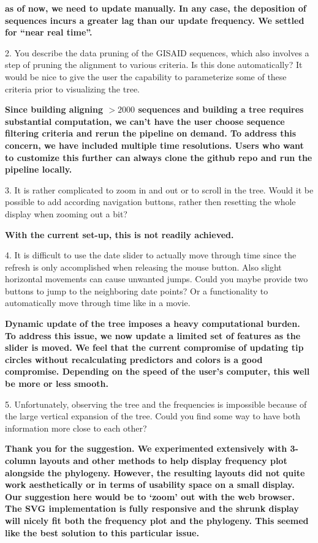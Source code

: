 \documentclass[11pt,oneside,letterpaper]{article}
\begin{document}
{\bf as of now, we need to update manually. In any case, the deposition of sequences incurs a greater lag than our update frequency. We settled for ``near real time''.}

2. You describe the data pruning of the GISAID sequences, which also involves a step of pruning the alignment to various criteria. Is this done automatically? It would be nice to give the user the capability to parameterize some of these criteria prior to visualizing the tree.

{\bf Since building aligning $>2000$ sequences and building a tree requires substantial computation, we can't have the user choose sequence filtering criteria and rerun the pipeline on demand. To address this concern, we have included multiple time resolutions. Users who want to customize this further can always clone the github repo and run the pipeline locally.}

3. It is rather complicated to zoom in and out or to scroll in the tree. Would it be possible to add according navigation buttons, rather then resetting the whole display when zooming out a bit?

{\bf With the current set-up, this is not readily achieved.}

4. It is difficult to use the date slider to actually move through time since the refresh is only accomplished when releasing the mouse button. Also slight horizontal movements can cause unwanted jumps. Could you maybe provide two buttons to jump to the neighboring date points? Or a functionality to automatically move through time like in a movie.

{\bf Dynamic update of the tree imposes a heavy computational burden. To address this issue, we now update a limited set of features as the slider is moved. We feel that the current compromise of updating tip circles without recalculating predictors and colors is a good compromise. Depending on the speed of the user's computer, this well be more or less smooth.}

5. Unfortunately, observing the tree and the frequencies is impossible because of the large vertical expansion of the tree. Could you find some way to have both information more close to each other?

\textbf{Thank you for the suggestion. We experimented extensively with 3-column layouts and other methods to help display frequency plot alongside the phylogeny. However, the resulting layouts did not quite work aesthetically or in terms of usability space on a small display. Our suggestion here would be to `zoom' out with the web browser. The SVG implementation is fully responsive and the shrunk display will nicely fit both the frequency plot and the phylogeny. This seemed like the best solution to this particular issue.}
\end{document}
